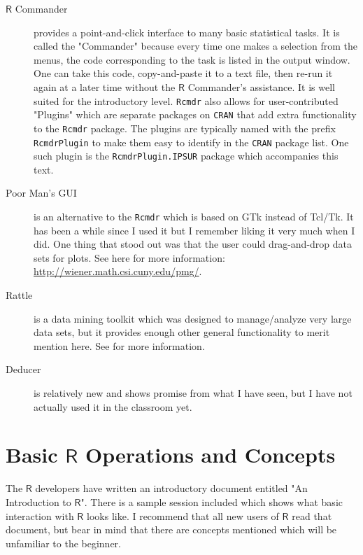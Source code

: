 \begin{description}
\item[{\(\mathsf{R}\) Commander}] provides a point-and-click interface to
many basic statistical tasks. It is called the "Commander"
because every time one makes a selection from the menus, the code
corresponding to the task is listed in the output window. One can
take this code, copy-and-paste it to a text file, then re-run it
again at a later time without the \(\mathsf{R}\) Commander's
assistance. It is well suited for the introductory level. \texttt{Rcmdr}
\cite{Rcmdr} also allows for user-contributed "Plugins" which are
separate packages on \texttt{CRAN} that add extra functionality to the
\texttt{Rcmdr} package. The plugins are typically named with the prefix
\texttt{RcmdrPlugin} to make them easy to identify in the \texttt{CRAN} package
list. One such plugin is the \texttt{RcmdrPlugin.IPSUR} package
\cite{RcmdrPlugin.IPSUR} which accompanies this text.
\item[{Poor Man's GUI}]  is an alternative
to the \texttt{Rcmdr} which is based on GTk instead of
Tcl/Tk. It has been a while since I used it but I
remember liking it very much when I did. One thing
that stood out was that the user could
drag-and-drop data sets for plots. See here for
more information:
\url{http://wiener.math.csi.cuny.edu/pmg/}.
\item[{Rattle}]  is a data mining toolkit which
was designed to manage/analyze very large data sets, but
it provides enough other general functionality to merit
mention here. See \cite{rattle} for more information.
\item[{Deducer}]  is relatively new and shows
promise from what I have seen, but I have not actually
used it in the classroom yet.
\end{description}

\section{Basic \(\mathsf{R}\) Operations and Concepts}
\label{sec-2-3}

The \(\mathsf{R}\) developers have written an introductory document
entitled "An Introduction to \(\mathsf{R}\)". There is a sample
session included which shows what basic interaction with
\(\mathsf{R}\) looks like. I recommend that all new users of
\(\mathsf{R}\) read that document, but bear in mind that there are
concepts mentioned which will be unfamiliar to the beginner.

